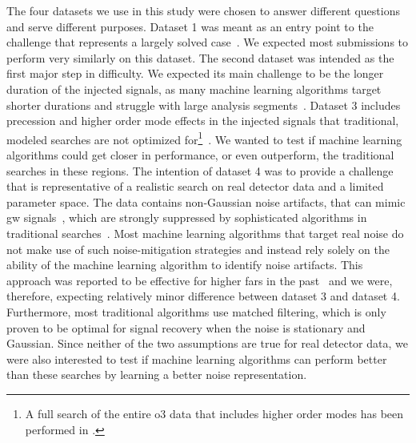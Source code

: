 The four datasets we use in this study were chosen to answer different questions and serve different purposes. Dataset 1 was meant as an entry point to the challenge that represents a largely solved case~\cite{George:2016hay, Gabbard:2017lja, Schafer:2021cml}. We expected most submissions to perform very similarly on this dataset. The second dataset was intended as the first major step in difficulty. We expected its main challenge to be the longer duration of the injected signals, as many machine learning algorithms target shorter durations and struggle with large analysis segments~\cite{Goodfellow:2016:DNN, Schafer:2020kor}. Dataset 3 includes precession and higher order mode effects in the injected signals that traditional, modeled searches are not optimized for\footnote{A full search of the entire \acrshort{o3} data that includes higher order modes has been performed in \cite{Chandra:2022ixv}.}~\cite{Harry:2016ijz, Harry:2017weg, Dhurkunde:2022aek}. We wanted to test if machine learning algorithms could get closer in performance, or even outperform, the traditional searches in these regions. The intention of dataset 4 was to provide a challenge that is representative of a realistic search on real detector data and a limited parameter space. The data contains non-Gaussian noise artifacts, that can mimic \acrshort{gw} signals~\cite{LIGOScientific:2014qfs, LIGOScientific:2016gtq, LIGOScientific:2019hgc, Davis:2022cmw}, which are strongly suppressed by sophisticated algorithms in traditional searches~\cite{Usman:2015kfa, Messick:2016aqy, LIGOScientific:2019hgc}. Most machine learning algorithms that target real noise do not make use of such noise-mitigation strategies and instead rely solely on the ability of the machine learning algorithm to identify noise artifacts. This approach was reported to be effective for higher \acrshort{far}s in the past~\cite{George:2017pmj, Gebhard:2019ldz, Krastev:2020skk, Wei:2020ztw} and we were, therefore, expecting relatively minor difference between dataset 3 and dataset 4. Furthermore, most traditional algorithms use matched filtering, which is only proven to be optimal for signal recovery when the noise is stationary and Gaussian. Since neither of the two assumptions are true for real detector data, we were also interested to test if machine learning algorithms can perform better than these searches by learning a better noise representation.

